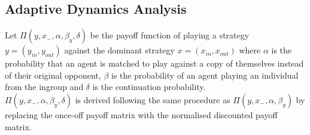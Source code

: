 \documentclass[]{llncs}
\begin{document}
\subsection{Adaptive Dynamics Analysis}

Let $ \Pi ( y, x_{-}, \alpha, \beta_y, \delta)$ be the payoff function of playing a strategy $y = (y_{in}, y_{out}) $ against the dominant strategy $x = (x_{in}, x_{out})$  where $\alpha$ is the probability that an agent is matched to play against a copy of themselves instead of their original opponent, $\beta$ is the probability of an agent playing an individual from the ingroup and $\delta$ is the continuation probability.
\\
$ \Pi ( y, x_{-}, \alpha, \beta_y, \delta)$ is derived following the same procedure as $ \Pi ( y, x_{-}, \alpha, \beta_y)$ by replacing the once-off payoff matrix with the normalised discounted payoff matrix.
\end{document}
